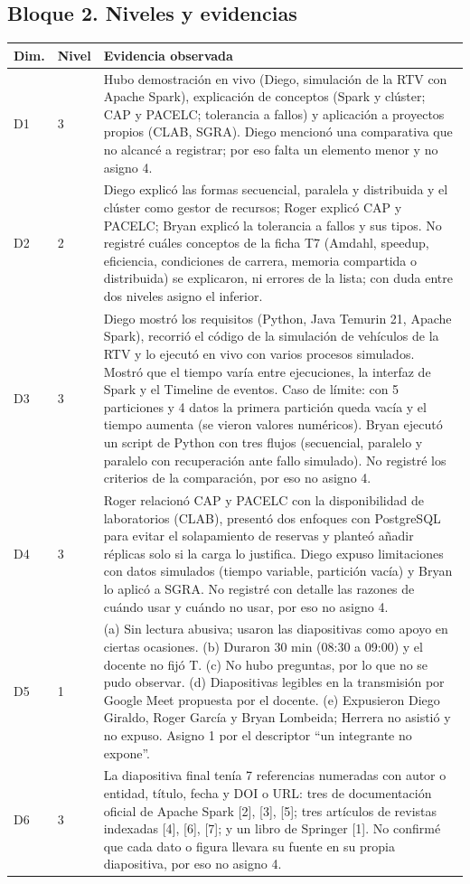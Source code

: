 \documentclass[11pt,a4paper]{article}
\begin{document}
\subsection*{Bloque 2. Niveles y evidencias}
\begin{tabular}{@{}>{\raggedright\arraybackslash}p{0.9cm}p{1.1cm}p{13.2cm}@{}}
\toprule
Dim. & Nivel & Evidencia observada \\
\midrule
D1 & 3 &
Hubo demostración en vivo (Diego, simulación de la RTV con Apache Spark), explicación de conceptos (Spark y clúster; CAP y PACELC; tolerancia a fallos) y aplicación a proyectos propios (CLAB, SGRA). Diego mencionó una comparativa que no alcancé a registrar; por eso falta un elemento menor y no asigno 4. \\
D2 & 2 &
Diego explicó las formas secuencial, paralela y distribuida y el clúster como gestor de recursos; Roger explicó CAP y PACELC; Bryan explicó la tolerancia a fallos y sus tipos. No registré cuáles conceptos de la ficha T7 (Amdahl, speedup, eficiencia, condiciones de carrera, memoria compartida o distribuida) se explicaron, ni errores de la lista; con duda entre dos niveles asigno el inferior. \\
D3 & 3 &
Diego mostró los requisitos (Python, Java Temurin 21, Apache Spark), recorrió el código de la simulación de vehículos de la RTV y lo ejecutó en vivo con varios procesos simulados. Mostró que el tiempo varía entre ejecuciones, la interfaz de Spark y el Timeline de eventos. Caso de límite: con 5 particiones y 4 datos la primera partición queda vacía y el tiempo aumenta (se vieron valores numéricos). Bryan ejecutó un script de Python con tres flujos (secuencial, paralelo y paralelo con recuperación ante fallo simulado). No registré los criterios de la comparación, por eso no asigno 4. \\
D4 & 3 &
Roger relacionó CAP y PACELC con la disponibilidad de laboratorios (CLAB), presentó dos enfoques con PostgreSQL para evitar el solapamiento de reservas y planteó añadir réplicas solo si la carga lo justifica. Diego expuso limitaciones con datos simulados (tiempo variable, partición vacía) y Bryan lo aplicó a SGRA. No registré con detalle las razones de cuándo usar y cuándo no usar, por eso no asigno 4. \\
D5 & 1 &
(a) Sin lectura abusiva; usaron las diapositivas como apoyo en ciertas ocasiones. (b) Duraron 30 min (08:30 a 09:00) y el docente no fijó T. (c) No hubo preguntas, por lo que no se pudo observar. (d) Diapositivas legibles en la transmisión por Google Meet propuesta por el docente. (e) Expusieron Diego Giraldo, Roger García y Bryan Lombeida; Herrera no asistió y no expuso. Asigno 1 por el descriptor ``un integrante no expone''. \\
D6 & 3 &
La diapositiva final tenía 7 referencias numeradas con autor o entidad, título, fecha y DOI o URL: tres de documentación oficial de Apache Spark [2], [3], [5]; tres artículos de revistas indexadas [4], [6], [7]; y un libro de Springer [1]. No confirmé que cada dato o figura llevara su fuente en su propia diapositiva, por eso no asigno 4. \\
\bottomrule
\end{tabular}
\end{document}

